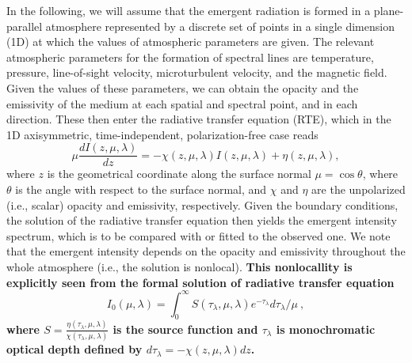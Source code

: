 \documentclass[referee]{aa}
\begin{document}
In the following, we will assume that the emergent radiation is formed in a plane-parallel atmosphere represented by a discrete set of points in a single dimension (1D) at which the values of atmospheric parameters are given. The relevant atmospheric parameters for the formation of spectral lines are temperature, pressure, line-of-sight         velocity, microturbulent velocity, and the magnetic field. Given the values of these parameters, we can obtain the opacity and the emissivity of the medium at each spatial and spectral point, and in each direction. These then enter the radiative transfer equation (RTE), which in the 1D axisymmetric, time-independent, polarization-free case reads
\begin{equation}
 \mu \frac{dI(z,\mu,\lambda)}{dz} = -\chi(z,\mu,\lambda) I(z,\mu,\lambda) + \eta(z,\mu,\lambda),
 \label{rte}
\end{equation}
where $z$ is the geometrical coordinate along the surface normal $\mu = \cos \theta$, where $\theta$ is the angle with respect to the surface normal, and $\chi$ and $\eta$ are the unpolarized (i.e., scalar) opacity and emissivity, respectively. Given the boundary conditions, the solution of the radiative transfer equation then yields the emergent intensity spectrum, which is to be compared with or fitted to the observed one. We note that the emergent intensity depends on the opacity and emissivity throughout the whole atmosphere (i.e., the solution is nonlocal). \textbf{This nonlocallity is explicitly seen from the  formal solution of radiative transfer equation
\begin{equation}
 I_0(\mu,\lambda) = \int_0^{\infty} S(\tau_{\lambda},\mu,\lambda) e^{-\tau_{\lambda}} d\tau_{\lambda} / \mu\ ,
\end{equation}
where $S=\frac{\eta(\tau_{\lambda},\mu,\lambda)}{\chi(\tau_{\lambda},\mu,\lambda)}$ is the source function and $\tau_{\lambda}$ is monochromatic optical depth defined by $d\tau_{\lambda} = -\chi(z,\mu,\lambda)dz$.}
\end{document}
